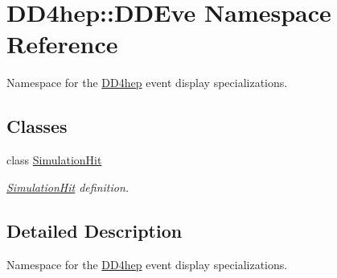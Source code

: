 \hypertarget{namespace_d_d4hep_1_1_d_d_eve}{}\section{D\+D4hep\+:\+:D\+D\+Eve Namespace Reference}
\label{namespace_d_d4hep_1_1_d_d_eve}


Namespace for the \hyperlink{namespace_d_d4hep}{D\+D4hep} event display specializations.  


\subsection*{Classes}
\begin{DoxyCompactItemize}
\item 
class \hyperlink{class_d_d4hep_1_1_d_d_eve_1_1_simulation_hit}{Simulation\+Hit}
\begin{DoxyCompactList}\small\item\em \hyperlink{class_d_d4hep_1_1_d_d_eve_1_1_simulation_hit}{Simulation\+Hit} definition. \end{DoxyCompactList}\end{DoxyCompactItemize}


\subsection{Detailed Description}
Namespace for the \hyperlink{namespace_d_d4hep}{D\+D4hep} event display specializations. 